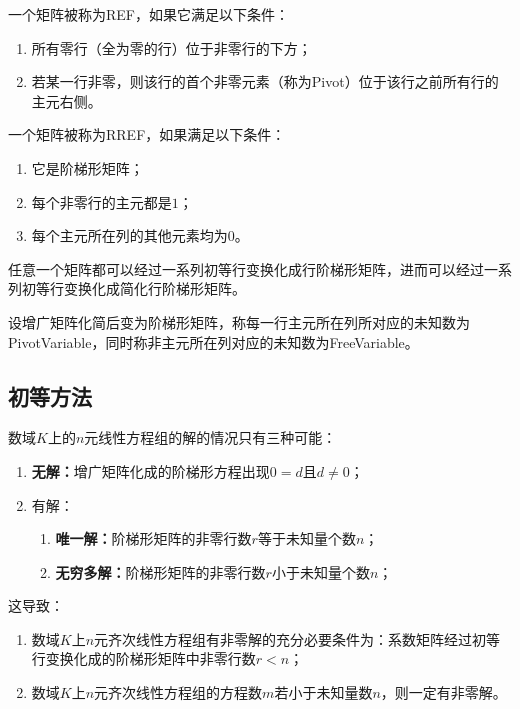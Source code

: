\begin{definition}
	一个矩阵被称为\gls{REF}，如果它满足以下条件：
	\begin{enumerate}
		\item 所有零行（全为零的行）位于非零行的下方；
		\item 若某一行非零，则该行的首个非零元素（称为\gls{Pivot}）位于该行之前所有行的主元右侧。
	\end{enumerate}
	一个矩阵被称为\gls{RREF}，如果满足以下条件：
	\begin{enumerate}
		\item 它是阶梯形矩阵；
		\item 每个非零行的主元都是$1$；
		\item 每个主元所在列的其他元素均为$0$。
	\end{enumerate}
\end{definition}
\begin{theorem}
	任意一个矩阵都可以经过一系列初等行变换化成行阶梯形矩阵，进而可以经过一系列初等行变换化成简化行阶梯形矩阵。
\end{theorem}
\begin{definition}
	设增广矩阵化简后变为阶梯形矩阵，称每一行主元所在列所对应的未知数为\gls{PivotVariable}，同时称非主元所在列对应的未知数为\gls{FreeVariable}。
\end{definition}
\subsection{初等方法}
\begin{theorem}\label{theo:SolutionOfSLE1}	
	数域$K$上的$n$元线性方程组的解的情况只有三种可能：
	\begin{enumerate}
		\item \textbf{无解：}增广矩阵化成的阶梯形方程出现$0=d$且$d\ne0$；
		\item 有解：
		\begin{enumerate}
			\item \textbf{唯一解：}阶梯形矩阵的非零行数$r$等于未知量个数$n$；
			\item \textbf{无穷多解：}阶梯形矩阵的非零行数$r$小于未知量个数$n$；
		\end{enumerate}
	\end{enumerate}
	这导致：
	\begin{enumerate}
		\item 数域$K$上$n$元齐次线性方程组有非零解的充分必要条件为：系数矩阵经过初等行变换化成的阶梯形矩阵中非零行数$r<n$；
		\item 数域$K$上$n$元齐次线性方程组的方程数$m$若小于未知量数$n$，则一定有非零解。
	\end{enumerate}
\end{theorem}
